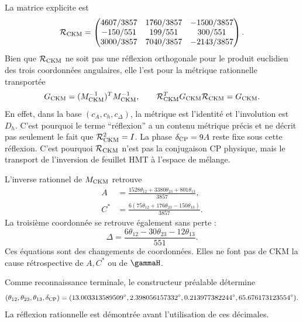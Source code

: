 La matrice explicite est
\begin{equation}
\label{eq:modular-Rckm-matrix}
\mathcal R_{\rm CKM}=
\begin{pmatrix}
4607/3857&1760/3857&-1500/3857\\
-150/551&199/551&300/551\\
3000/3857&7040/3857&-2143/3857
\end{pmatrix}.
\end{equation}
Bien que \(\mathcal R_{\rm CKM}\) ne soit pas une réflexion orthogonale pour le
produit euclidien des trois coordonnées angulaires, elle l'est pour la
métrique rationnelle transportée
\begin{equation}
\label{eq:modular-ckm-metric}
G_{\rm CKM}=(M_{\rm CKM}^{-1})^TM_{\rm CKM}^{-1},
\qquad
\mathcal R_{\rm CKM}^TG_{\rm CKM}\mathcal R_{\rm CKM}=G_{\rm CKM}.
\end{equation}
En effet, dans la base \((c_A,c_h,c_\Delta)\), la métrique est l'identité
et l'involution est \(D_h\). C'est pourquoi le terme ``réflexion'' a un
contenu métrique précis et ne décrit pas seulement le fait que
\(\mathcal R_{\rm CKM}^2=I\).
La phase \(\delta_{\rm CP}=9A\) reste fixe sous cette réflexion. C'est
pourquoi \(\mathcal R_{\rm CKM}\) n'est pas la conjugaison CP physique, mais le
transport de l'inversion de feuillet HMT à l'espace de mélange.

L'inverse rationnel de \(M_{\rm CKM}\) retrouve
\begin{align}
A&=\frac{1528\theta_{12}+3380\theta_{23}+801\theta_{13}}{3857},
\label{eq:modular-A-from-ckm}\\
C^*&=\frac{6(75\theta_{12}+176\theta_{23}-150\theta_{13})}{3857}.
\label{eq:modular-C-from-ckm}
\end{align}
La troisième coordonnée se retrouve également sans perte :
\begin{equation}
\label{eq:modular-Delta-from-ckm}
\Delta
=\frac{6\theta_{12}-30\theta_{23}-12\theta_{13}}{551}.
\end{equation}
Ces équations sont des changements de coordonnées. Elles ne font pas de CKM la cause
rétrospective de \(A,C^*\) ou de \(\gammaH\).

Comme reconnaissance terminale, le constructeur préalable détermine
\begin{equation}
\label{eq:modular-ckm-values}
(\theta_{12},\theta_{23},\theta_{13},\delta_{\rm CP})
=(13.003313589509^\circ,
2.398056157332^\circ,
0.213977382244^\circ,
65.676173123554^\circ).
\end{equation}
La réflexion rationnelle est démontrée avant l'utilisation de ces décimales.

